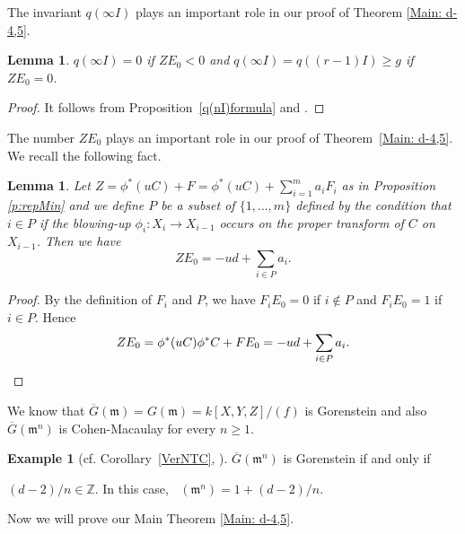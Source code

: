 \documentclass[12pt]{amsart}
\newtheorem{lem}[thm]{Lemma}
\theoremstyle{definition}
\newtheorem{ex}[thm]{Example}
\theoremstyle{remark}
\numberwithin{equation}{section}
\newcommand{\thmref}[1]{Theorem~\ref{#1}}
\newcommand{\corref}[1]{Corollary~\ref{#1}}
\newcommand{\proref}[1]{Proposition~\ref{#1}}
\DeclareMathOperator{\br}{\bar r}
\newcommand{\m}{\mathfrak m}
\newcommand{\Z}{\mathbb Z}
\renewcommand{\:}{\colon}
\begin{document}
The invariant $q(\infty I)$ plays an important role in our proof of 
Theorem \ref{Main: d-4,5}.

\begin{lem}\label{l:q(inf)}   $q(\infty I ) = 0$ if $Z E_0 < 0$ and $q(\infty I )= q((r-1) I) \ge g$ 
if  $Z E_0=0$. 
\end{lem}
\begin{proof}
It follows from \proref{q(nI)formula} and \cite[3.5, 3.6]{OWY5}.
\end{proof}

\par 
The number $Z E_0$ plays an important role in our proof of  \thmref{Main: d-4,5}.
We recall the following fact.  

\begin{lem}\label{ZE_0}
 Let $Z = \phi^*(u C) + F = \phi^*( u C) + \sum_{i=1}^m a_i F_i$ as 
in Proposition \ref{p:repMin} and we define $P$ be a subset of $\{1, \ldots , m\}$ 
defined by the condition that $i\in  P$ if the blowing-up $\phi_i\: X_i \to X_{i-1}$
 occurs on the proper transform of $C$ on $X_{i-1}$. Then we have  
\[Z E_0 = - ud + \sum_{i\in P} a_i.\]
\end{lem}

\begin{proof}
By the definition of $F_i$ and $P$, we have $F_iE_0= 0$ if $i \not\in P$ and $F_iE_0= 1$ if $i \in P$.
Hence 
\[
ZE_0 = \phi^*(u C)\phi^*C + FE_0 = - ud + \sum_{i\in P} a_i.
\qedhere
\]
\end{proof}

\par 
We know that $\overline{G}(\m)= G(\m) = k[X,Y,Z]/ (f)$ is Gorenstein and also 
$\overline{G}(\m^n)$ is Cohen-Macaulay for every $n\ge 1$.  

\begin{ex} [cf. \corref{VerNTC}, \cite{GI}] \label{e:m^n}
$\overline{G}(\m^n)$ is Gorenstein if and only if \par\noindent
 $(d-2)/n \in \Z$.
In this case, $\br(\m^n) = 1+(d-2)/n$. 
\end{ex}

\par 
Now we will prove our Main Theorem \ref{Main: d-4,5}.
\end{document}
